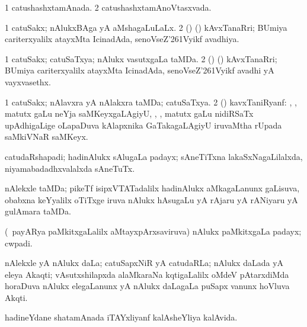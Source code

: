 \bentry
{}
\gl{\gu}
\bmng
\bnum
\num{1} catushashxtamAnada. 
\num{2} catushashxtamAnoVtasxvada. 
\enum
\emng
\eentry

\bentry
{}
\gl{\gu}
\bmng
\bnum
\num{1} catuSakx; nAlukxBAga yA aMshagaLuLaLx. 
\num{2} () (\BUvi) kAvxTanaRri; BUmiya cariterxyalilx atayxMta IcinadAda, senoVseZ\char'261Vyikf avadhiya. 
\enum
\emng
\eentry

\bentry
{}
\gl{\nA}
\bmng
\bnum
\num{1} catuSakx; catuSaTxya; nAlukx vasutxgaLa taMDa. 
\num{2} () (\BUvi) kAvxTanaRri; BUmiya cariterxyalilx atayxMta IcinadAda, senoVseZ\char'261Vyikf avadhi yA vayxvasethx. 
\enum
\emng
\eentry

\bentry
{}
\gl{\nA}
\bmng
\bnum
\num{1} catuSakx; nAlavxra yA nAlakxra taMDa; catuSaTxya. 
\num{2} (\ga) kavxTaniRyanf: , ,  matutx gaLu neYja saMKeyxgaLAgiyU, , , matutx gaLu nidiRSaTx upAdhigaLige oLapaDuva kAlapxnika GaTakagaLAgiyU iruvaMtha  rUpada saMkiVNaR saMKeyx. 
\enum
\emng
\eentry

\bentry
{}
\gl{\nA}
\bmng
catudaRshapadi; hadinAlukx sAlugaLa padayx; sAneTiTxna lakaSxNagaLilalxda, niyamabadadhxvalalxda sAneTuTx. 
\emng
\eentry

\bentry
{}
\gl{\nA}
\bmng
nAlekxle taMDa; pikeTf isipxVTATadalilx hadinAlukx aMkagaLanunx gaLisuva, obabxna keYyalilx oTiTxge iruva nAlukx hAsugaLu yA rAjaru yA rANiyaru yA gulAmara taMDa. 
\emng
\eentry

\bentry
{}
\gl{\nA}
\bmng
(\sA\ payARya paMkitxgaLalilx aMtayxpArxsaviruva) nAlukx paMkitxgaLa padayx; cwpadi. 
\emng
\eentry

\bentry
{}
\gl{\nA}
\bmng
nAlekxle yA nAlukx daLa; catuSapxNiR yA catudaRLa; nAlukx daLada yA eleya Akaqti; vAsutxshilapxda alaMkaraNa kqtigaLalilx oMdeV pAtarxdiMda horaDuva nAlukx elegaLanunx yA nAlukx daLagaLa puSapx \mo vanunx hoVluva Akqti.  
\emng
\eentry

\bentry
{}
\gl{\nA}
\bmng
hadineYdane shatamAnada iTAYxliyanf kalAsheYliya kalAvida. 
\emng
\eentry

